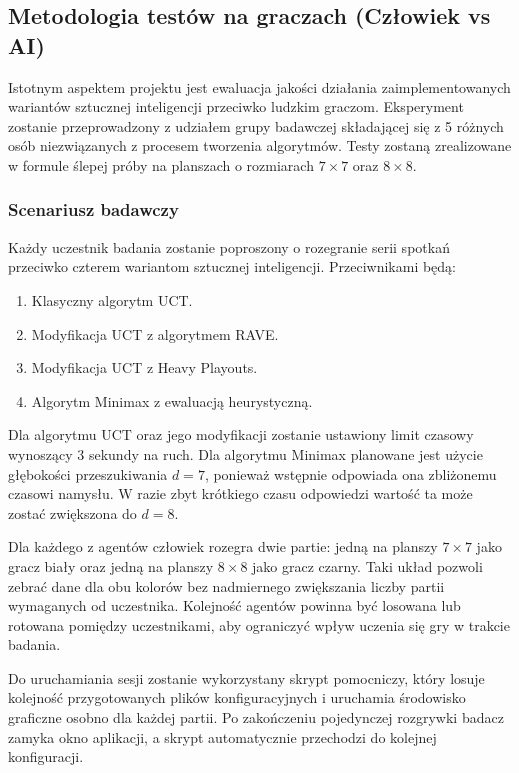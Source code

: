 \documentclass{article}
\begin{document}
\subsection{Metodologia testów na graczach (Człowiek vs AI)}

Istotnym aspektem projektu jest ewaluacja jakości działania zaimplementowanych wariantów sztucznej inteligencji przeciwko ludzkim graczom. Eksperyment zostanie przeprowadzony z udziałem grupy badawczej składającej się z 5 różnych osób niezwiązanych z procesem tworzenia algorytmów. Testy zostaną zrealizowane w formule ślepej próby na planszach o rozmiarach $7 \times 7$ oraz $8 \times 8$.

\subsubsection{Scenariusz badawczy}
Każdy uczestnik badania zostanie poproszony o rozegranie serii spotkań przeciwko czterem wariantom sztucznej inteligencji. Przeciwnikami będą:
\begin{enumerate}
    \item Klasyczny algorytm UCT.
    \item Modyfikacja UCT z algorytmem RAVE.
    \item Modyfikacja UCT z Heavy Playouts.
    \item Algorytm Minimax z ewaluacją heurystyczną.
\end{enumerate}

Dla algorytmu UCT oraz jego modyfikacji zostanie ustawiony limit czasowy wynoszący 3 sekundy na ruch. Dla algorytmu Minimax planowane jest użycie głębokości przeszukiwania $d = 7$, ponieważ wstępnie odpowiada ona zbliżonemu czasowi namysłu. W razie zbyt krótkiego czasu odpowiedzi wartość ta może zostać zwiększona do $d = 8$.

Dla każdego z agentów człowiek rozegra dwie partie: jedną na planszy $7 \times 7$ jako gracz biały oraz jedną na planszy $8 \times 8$ jako gracz czarny. Taki układ pozwoli zebrać dane dla obu kolorów bez nadmiernego zwiększania liczby partii wymaganych od uczestnika. Kolejność agentów powinna być losowana lub rotowana pomiędzy uczestnikami, aby ograniczyć wpływ uczenia się gry w trakcie badania.

Do uruchamiania sesji zostanie wykorzystany skrypt pomocniczy, który losuje kolejność przygotowanych plików konfiguracyjnych i uruchamia środowisko graficzne osobno dla każdej partii. Po zakończeniu pojedynczej rozgrywki badacz zamyka okno aplikacji, a skrypt automatycznie przechodzi do kolejnej konfiguracji.
\end{document}
